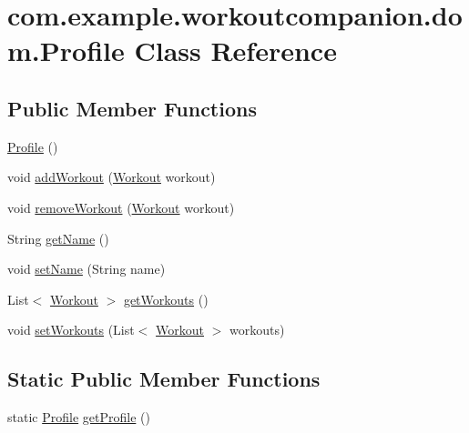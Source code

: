 \hypertarget{classcom_1_1example_1_1workoutcompanion_1_1dom_1_1_profile}{\section{com.\-example.\-workoutcompanion.\-dom.\-Profile Class Reference}
\label{classcom_1_1example_1_1workoutcompanion_1_1dom_1_1_profile}
}
\subsection*{Public Member Functions}
\begin{DoxyCompactItemize}
\item 
\hyperlink{classcom_1_1example_1_1workoutcompanion_1_1dom_1_1_profile_a7864d394beb2f58cca1319c57d525048}{Profile} ()
\item 
void \hyperlink{classcom_1_1example_1_1workoutcompanion_1_1dom_1_1_profile_ab7f72d54e1eb8cf4311e025ad4629a01}{add\-Workout} (\hyperlink{classcom_1_1example_1_1workoutcompanion_1_1dom_1_1_workout}{Workout} workout)
\item 
void \hyperlink{classcom_1_1example_1_1workoutcompanion_1_1dom_1_1_profile_a7bc92d322add1308cba46dafd1018195}{remove\-Workout} (\hyperlink{classcom_1_1example_1_1workoutcompanion_1_1dom_1_1_workout}{Workout} workout)
\item 
String \hyperlink{classcom_1_1example_1_1workoutcompanion_1_1dom_1_1_profile_a226ddee02ad02b0dd027f754dede5031}{get\-Name} ()
\item 
void \hyperlink{classcom_1_1example_1_1workoutcompanion_1_1dom_1_1_profile_a127e4507e0f6c9eb08125a1507a01944}{set\-Name} (String name)
\item 
List$<$ \hyperlink{classcom_1_1example_1_1workoutcompanion_1_1dom_1_1_workout}{Workout} $>$ \hyperlink{classcom_1_1example_1_1workoutcompanion_1_1dom_1_1_profile_af184b95d5481b6bc850b602b470a02c1}{get\-Workouts} ()
\item 
void \hyperlink{classcom_1_1example_1_1workoutcompanion_1_1dom_1_1_profile_a33221af697e6082f614da117a87a28a1}{set\-Workouts} (List$<$ \hyperlink{classcom_1_1example_1_1workoutcompanion_1_1dom_1_1_workout}{Workout} $>$ workouts)
\end{DoxyCompactItemize}
\subsection*{Static Public Member Functions}
\begin{DoxyCompactItemize}
\item 
static \hyperlink{classcom_1_1example_1_1workoutcompanion_1_1dom_1_1_profile}{Profile} \hyperlink{classcom_1_1example_1_1workoutcompanion_1_1dom_1_1_profile_ac860bbe8d3b67fa0297092af3fdd8546}{get\-Profile} ()
\end{DoxyCompactItemize}


